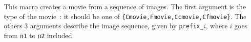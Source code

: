 This macro creates a movie from a sequence of images. The first argument
is the type of the movie~: it should be one of 
\verb+{Cmovie,Fmovie,Ccmovie,Cfmovie}+. The others 3 arguments describe
the image sequence, given by \verb+prefix_+$i$, where $i$ goes
from \verb+n1+ to \verb+n2+ included.